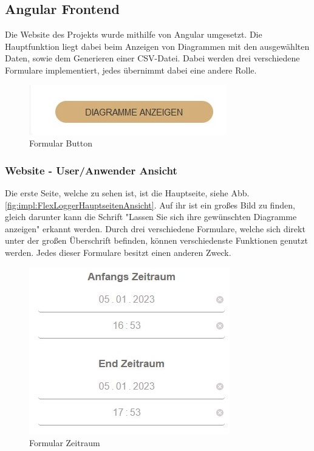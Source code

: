 \subsection{Angular Frontend}
Die Website des Projekts wurde mithilfe von Angular umgesetzt. Die Hauptfunktion liegt dabei beim Anzeigen von Diagrammen mit den ausgewählten Daten, sowie dem Generieren einer CSV-Datei. Dabei werden drei verschiedene Formulare implementiert, jedes übernimmt dabei eine andere Rolle.


\begin{figure}
    \centering
    \includegraphics[scale=1]{pics/FlexLoggerWebsiteFormulare_button.jpg}
    \caption{Formular Button}
    \label{fig:impl:FlexLoggerHauptseitenAnsichtButton}
    \end{figure}

\subsubsection{Website - User/Anwender Ansicht}
Die erste Seite, welche zu sehen ist, ist die Hauptseite, siehe Abb. \ref{fig:impl:FlexLoggerHauptseitenAnsicht}. Auf ihr ist ein großes Bild zu finden, gleich darunter kann die Schrift "Lassen Sie sich ihre gewünschten Diagramme anzeigen" erkannt werden.
Durch drei verschiedene Formulare, welche sich direkt unter der großen Überschrift befinden, können verschiedenste Funktionen genutzt werden. Jedes dieser Formulare besitzt einen anderen Zweck.

\begin{figure}
    \centering
    \includegraphics[scale=1]{pics/FlexLoggerWebsiteFormulare_zeitraum.jpg}
    \caption{Formular Zeitraum}
    \label{fig:impl:FlexLoggerHauptseitenAnsichtZeitraum}
    \end{figure}

